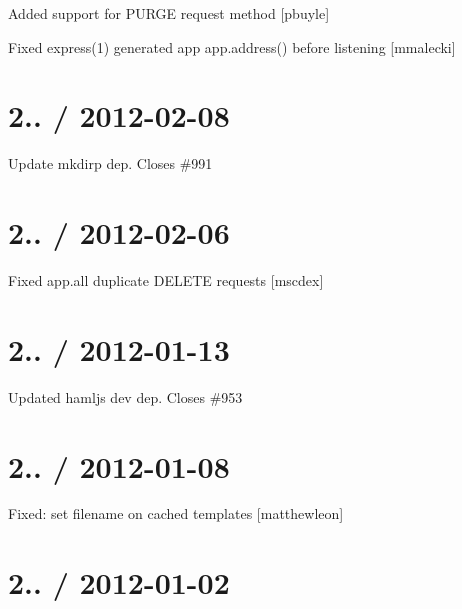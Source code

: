 \begin{DoxyItemize}
\item Added support for P\+U\+R\+G\+E request method \mbox{[}pbuyle\mbox{]}
\item Fixed {\ttfamily express(1)} generated app {\ttfamily app.\+address()} before {\ttfamily listening} \mbox{[}mmalecki\mbox{]}
\end{DoxyItemize}

\section*{2.. / 2012-\/02-\/08 }


\begin{DoxyItemize}
\item Update mkdirp dep. Closes \#991
\end{DoxyItemize}

\section*{2.. / 2012-\/02-\/06 }


\begin{DoxyItemize}
\item Fixed {\ttfamily app.\+all} duplicate D\+E\+L\+E\+T\+E requests \mbox{[}mscdex\mbox{]}
\end{DoxyItemize}

\section*{2.. / 2012-\/01-\/13 }


\begin{DoxyItemize}
\item Updated hamljs dev dep. Closes \#953
\end{DoxyItemize}

\section*{2.. / 2012-\/01-\/08 }


\begin{DoxyItemize}
\item Fixed\+: set {\ttfamily filename} on cached templates \mbox{[}matthewleon\mbox{]}
\end{DoxyItemize}

\section*{2.. / 2012-\/01-\/02 }


